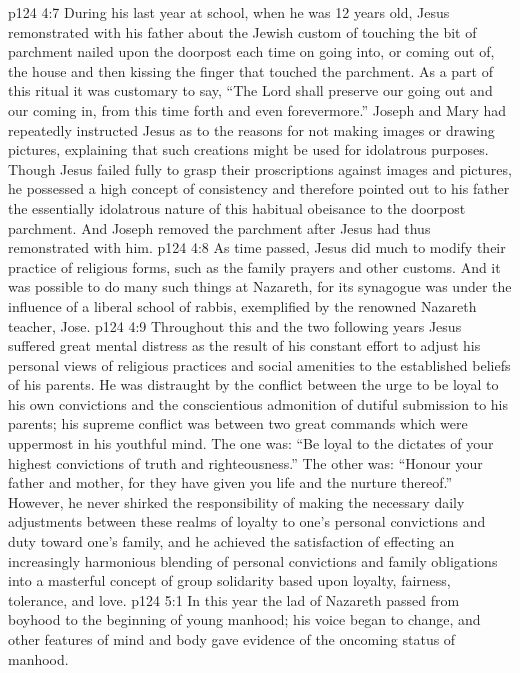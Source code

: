 \vs p124 4:7 \pc During his last year at school, when he was 12 years old, Jesus remonstrated with his father about the Jewish custom of touching the bit of parchment nailed upon the doorpost each time on going into, or coming out of, the house and then kissing the finger that touched the parchment. As a part of this ritual it was customary to say, “The Lord shall preserve our going out and our coming in, from this time forth and even forevermore.” Joseph and Mary had repeatedly instructed Jesus as to the reasons for not making images or drawing pictures, explaining that such creations might be used for idolatrous purposes. Though Jesus failed fully to grasp their proscriptions against images and pictures, he possessed a high concept of consistency and therefore pointed out to his father the essentially idolatrous nature of this habitual obeisance to the doorpost parchment. And Joseph removed the parchment after Jesus had thus remonstrated with him.
\vs p124 4:8 As time passed, Jesus did much to modify their practice of religious forms, such as the family prayers and other customs. And it was possible to do many such things at Nazareth, for its synagogue was under the influence of a liberal school of rabbis, exemplified by the renowned Nazareth teacher, Jose.
\vs p124 4:9 Throughout this and the two following years Jesus suffered great mental distress as the result of his constant effort to adjust his personal views of religious practices and social amenities to the established beliefs of his parents. He was distraught by the conflict between the urge to be loyal to his own convictions and the conscientious admonition of dutiful submission to his parents; his supreme conflict was between two great commands which were uppermost in his youthful mind. The one was: “Be loyal to the dictates of your highest convictions of truth and righteousness.” The other was: “Honour your father and mother, for they have given you life and the nurture thereof.” However, he never shirked the responsibility of making the necessary daily adjustments between these realms of loyalty to one’s personal convictions and duty toward one’s family, and he achieved the satisfaction of effecting an increasingly harmonious blending of personal convictions and family obligations into a masterful concept of group solidarity based upon loyalty, fairness, tolerance, and love.
\vs p124 5:1 In this year the lad of Nazareth passed from boyhood to the beginning of young manhood; his voice began to change, and other features of mind and body gave evidence of the oncoming status of manhood.

